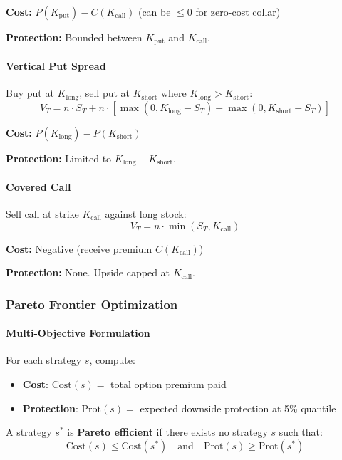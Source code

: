 \textbf{Cost:} $P(K_{\text{put}}) - C(K_{\text{call}})$ (can be $\leq 0$ for zero-cost collar)

\textbf{Protection:} Bounded between $K_{\text{put}}$ and $K_{\text{call}}$.

\paragraph{Vertical Put Spread}

Buy put at $K_{\text{long}}$, sell put at $K_{\text{short}}$ where $K_{\text{long}} > K_{\text{short}}$:
\[
V_T = n \cdot S_T + n \cdot \left[ \max(0, K_{\text{long}} - S_T) - \max(0, K_{\text{short}} - S_T) \right]
\]

\textbf{Cost:} $P(K_{\text{long}}) - P(K_{\text{short}})$

\textbf{Protection:} Limited to $K_{\text{long}} - K_{\text{short}}$.

\paragraph{Covered Call}

Sell call at strike $K_{\text{call}}$ against long stock:
\[
V_T = n \cdot \min(S_T, K_{\text{call}})
\]

\textbf{Cost:} Negative (receive premium $C(K_{\text{call}})$)

\textbf{Protection:} None. Upside capped at $K_{\text{call}}$.

\subsubsection{Pareto Frontier Optimization}

\paragraph{Multi-Objective Formulation}

For each strategy $s$, compute:
\begin{itemize}
  \item \textbf{Cost}: $\text{Cost}(s) = $ total option premium paid
  \item \textbf{Protection}: $\text{Prot}(s) = $ expected downside protection at 5\% quantile
\end{itemize}

A strategy $s^*$ is \textbf{Pareto efficient} if there exists no strategy $s$ such that:
\[
\text{Cost}(s) \leq \text{Cost}(s^*) \quad \text{and} \quad \text{Prot}(s) \geq \text{Prot}(s^*)
\]

